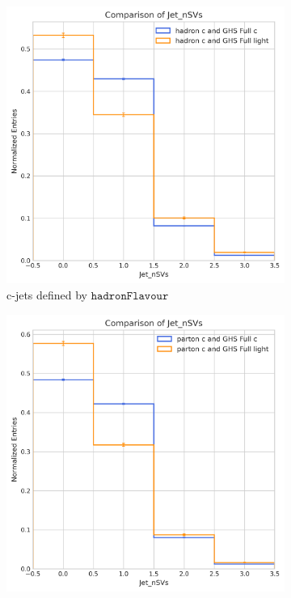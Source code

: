 \documentclass[10pt,twocolumn]{article}
\newcommand*{\hadFlav}{\texttt{hadronFlavour}}
\begin{document}
\begin{figure}[!htbp]
    \centering
    \begin{subfigure}[t]{0.48\textwidth}
        \centering
        \includegraphics[width=\textwidth]{images/compare_nSVs_GHSFull_light_vs_c_filter_hadronFlavour_4.png}
        \caption{c-jets defined by $\hadFlav$}
        \label{fig:jet_nSVs_full_c_hadron_c}
    \end{subfigure}
    \hfill
    \begin{subfigure}[t]{0.48\textwidth}
        \centering
        \includegraphics[width=\textwidth]{images/compare_nSVs_GHSFull_light_vs_c_filter_partonFlavour_4.png}

\end{subfigure}
\end{figure}
\end{document}
